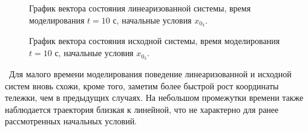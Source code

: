 \begin{figure}[!h]
\caption{График вектора состояния линеаризованной системы, время моделирования $t=10$ с, начальные условия $x_{0_3}$.}
\label{2_x_lin_03_lg}
\end{figure}

\begin{figure}[!h]
\caption{График вектора состояния исходной системы, время моделирования $t=10$ с, начальные условия $x_{0_3}$.}
\label{2_x_nlin_03_lg}
\end{figure}
\newpage
\,
\newpage
 Для малого времени моделирования поведение линеаризованной и исходной систем вновь схожи, кроме того, заметим более быстрой рост координаты тележки, чем в предыдущих случаях. На небольшом промежутки времени также наблюдается траектория близкая к линейной, что не характерно для ранее рассмотренных начальных условий.
\endinput